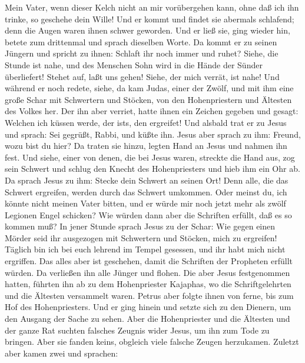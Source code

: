 Mein Vater, wenn dieser Kelch nicht an mir vorübergehen kann, ohne daß
ich ihn trinke, so geschehe dein Wille!  Und er kommt und
findet sie abermals schlafend; denn die Augen waren ihnen schwer
geworden.  Und er ließ sie, ging wieder hin, betete zum
drittenmal und sprach dieselben Worte.  Da kommt er zu
seinen Jüngern und spricht zu ihnen: Schlaft ihr noch immer und ruhet?
Siehe, die Stunde ist nahe, und des Menschen Sohn wird in die Hände der
Sünder überliefert!  Stehet auf, laßt uns gehen! Siehe,
der mich verrät, ist nahe!  Und während er noch redete,
siehe, da kam Judas, einer der Zwölf, und mit ihm eine große Schar mit
Schwertern und Stöcken, von den Hohenpriestern und Ältesten des Volkes
her.  Der ihn aber verriet, hatte ihnen ein Zeichen
gegeben und gesagt: Welchen ich küssen werde, der ist\textquotesingle s,
den ergreifet!  Und alsbald trat er zu Jesus und sprach:
Sei gegrüßt, Rabbi, und küßte ihn.  Jesus aber sprach zu
ihm: Freund, wozu bist du hier? Da traten sie hinzu, legten Hand an
Jesus und nahmen ihn fest.  Und siehe, einer von denen,
die bei Jesus waren, streckte die Hand aus, zog sein Schwert und schlug
den Knecht des Hohenpriesters und hieb ihm ein Ohr ab. 
Da sprach Jesus zu ihm: Stecke dein Schwert an seinen Ort! Denn alle,
die das Schwert ergreifen, werden durch das Schwert umkommen.
 Oder meinst du, ich könnte nicht meinen Vater bitten,
und er würde mir noch jetzt mehr als zwölf Legionen Engel schicken?
 Wie würden dann aber die Schriften erfüllt, daß es so
kommen muß?  In jener Stunde sprach Jesus zu der Schar:
Wie gegen einen Mörder seid ihr ausgezogen mit Schwertern und Stöcken,
mich zu ergreifen! Täglich bin ich bei euch lehrend im Tempel gesessen,
und ihr habt mich nicht ergriffen.  Das alles aber ist
geschehen, damit die Schriften der Propheten erfüllt würden. Da
verließen ihn alle Jünger und flohen.  Die aber Jesus
festgenommen hatten, führten ihn ab zu dem Hohenpriester Kajaphas, wo
die Schriftgelehrten und die Ältesten versammelt waren. 
Petrus aber folgte ihnen von ferne, bis zum Hof des Hohenpriesters. Und
er ging hinein und setzte sich zu den Dienern, um den Ausgang der Sache
zu sehen.  Aber die Hohenpriester und die Ältesten und
der ganze Rat suchten falsches Zeugnis wider Jesus, um ihn zum Tode zu
bringen.  Aber sie fanden keins, obgleich viele falsche
Zeugen herzukamen.  Zuletzt aber kamen zwei und sprachen:
